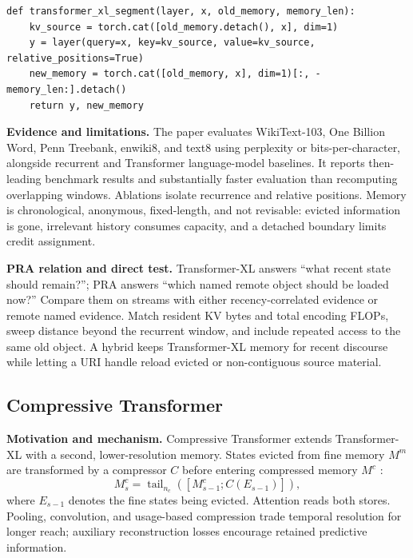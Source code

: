 \begin{lstlisting}[caption={Segment recurrence; detach is the defining optimization boundary}]
def transformer_xl_segment(layer, x, old_memory, memory_len):
    kv_source = torch.cat([old_memory.detach(), x], dim=1)
    y = layer(query=x, key=kv_source, value=kv_source, relative_positions=True)
    new_memory = torch.cat([old_memory, x], dim=1)[:, -memory_len:].detach()
    return y, new_memory
\end{lstlisting}

\textbf{Evidence and limitations.} The paper evaluates WikiText-103, One Billion Word,
Penn Treebank, enwiki8, and text8 using perplexity or bits-per-character, alongside recurrent
and Transformer language-model baselines. It reports then-leading benchmark results and
substantially faster evaluation than recomputing overlapping windows. Ablations isolate
recurrence and relative positions.  Memory is chronological, anonymous, fixed-length, and
not revisable: evicted information is gone, irrelevant history consumes capacity, and a
detached boundary limits credit assignment.

\textbf{PRA relation and direct test.} Transformer-XL answers ``what recent state should
remain?''; PRA answers ``which named remote object should be loaded now?''  Compare them on
streams with either recency-correlated evidence or remote named evidence.  Match resident
KV bytes and total encoding FLOPs, sweep distance beyond the recurrent window, and include
repeated access to the same old object.  A hybrid keeps Transformer-XL memory for recent
discourse while letting a URI handle reload evicted or non-contiguous source material.

\subsection{Compressive Transformer}

\textbf{Motivation and mechanism.} Compressive Transformer extends Transformer-XL with a
second, lower-resolution memory.  States evicted from fine memory $M^m$ are transformed by
a compressor $C$ before entering compressed memory $M^c$ \citep{rae2020compressive}:
\begin{equation}
M^c_s=\operatorname{tail}_{n_c}([M^c_{s-1};C(E_{s-1})]),
\end{equation}
where $E_{s-1}$ denotes the fine states being evicted.  Attention reads both stores.  Pooling,
convolution, and usage-based compression trade temporal resolution for longer reach; auxiliary
reconstruction losses encourage retained predictive information.

